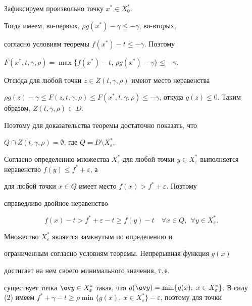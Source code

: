 \begin{pf}


Зафиксируем произвольно точку $x^*\in X_0^*$.


Тогда имеем, во-первых, $\rho g(x^*)-\gamma\le -\gamma$, во-вторых,


согласно условиям теоремы $f(x^*)-t\le-\gamma$. Поэтому


$F(x^*,t,\gamma,\rho)=\max\{f(x^*)-t$, $\rho g(x^*)-\gamma\}\le-\gamma$.


Отсюда для любой точки $z\in Z(t,\gamma,\rho)$ имеют место неравенства


$\rho g(z)-\gamma\le F(z,t,\gamma,\rho)\le F(x^*,t,\gamma,\rho)\le


-\gamma$, откуда $g(z)\le 0$. Таким образом, $Z(t,\gamma,\rho)\subset D$.


Поэтому для доказательства теоремы достаточно показать, что 


$Q\cap Z(t,\gamma,\rho)=\emptyset$, где $Q=D\setminus X_{\varepsilon}^*$.





Согласно определению множества $X_{\varepsilon}^*$ для любой точки $y\in


X_{\varepsilon}^*$ выполняется неравенство $f(y)\le f^*+\varepsilon$, а


для любой точки $x\in Q$ имеет место $f(x)>f^*+\varepsilon$. Поэтому


справедливо двойное неравенство


\begin{equation}


f(x)-t>f^*+\varepsilon -t\ge f(y)-t \quad \forall x\in Q,\ \ \forall y\in


X_{\varepsilon}^*.


\end{equation}





Множество $X_{\varepsilon}^*$ является замкнутым по определению и


ограниченным согласно условиям теоремы. Непрерывная функция $g(x)$ 


достигает на нем своего минимального значения, т.\,е.


существует точка $\ov y \in X_{\varepsilon}^*$ такая, что $g(\ov


y)=\min\{g(x),\ x\in X_{\varepsilon}^*\}$. В силу (2) имеем $f^*+\gamma-t\ge


\rho\min\{g(x),\ x\in X_{\varepsilon}^*\}-\varepsilon$, поэтому для точки



\end{pf}
